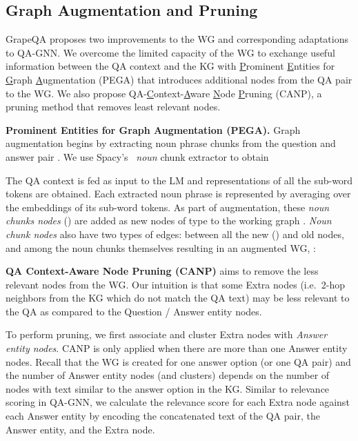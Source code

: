 \documentclass[11pt]{article}
\renewcommand{\paragraph}[1]{\vspace{1mm}\noindent\textbf{#1}}
\newcommand{\methodname}{GrapeQA}
\begin{document}
\subsection{Graph Augmentation and Pruning}
\methodname{} proposes two improvements to the WG and corresponding adaptations to QA-GNN.
We overcome the limited capacity of the WG to exchange useful information between the QA context and the KG with \underline{P}rominent \underline{E}ntities for \underline{G}raph \underline{A}ugmentation (PEGA) that introduces additional nodes from the QA pair to the WG.
We also propose QA-\underline{C}ontext-\underline{A}ware \underline{N}ode \underline{P}runing (CANP), a pruning method that removes least relevant nodes.



\paragraph{Prominent Entities for Graph Augmentation (PEGA).}
\label{22}
Graph augmentation begins by extracting noun phrase chunks  from the question and answer pair .
We use Spacy's~\cite{Honnibal_spaCy_Industrial-strength_Natural_2020} \emph{noun} chunk extractor  to obtain

The QA context is fed as input to the LM and representations of all the sub-word tokens are obtained.
Each extracted noun phrase is represented by averaging over the embeddings of its sub-word tokens.
As part of augmentation, these \emph{noun chunks nodes} () are added as new nodes of type  to the working graph .
\emph{Noun chunk nodes} also have two types of edges:  between all the new () and old  nodes, and  among the noun chunks themselves resulting in an augmented WG, :





\paragraph{QA Context-Aware Node Pruning (CANP)}
\label{23}
aims to remove the less relevant nodes from the WG.
Our intuition is that some Extra nodes (i.e.~2-hop neighbors from the KG which do not match the QA text) may be less relevant to the QA as compared to the Question / Answer entity nodes.

To perform pruning, we first associate and cluster Extra nodes with \emph{Answer entity nodes}.
CANP is only applied when there are more than one Answer entity nodes.
Recall that the WG is created for one answer option (or one QA pair) and the number of Answer entity nodes (and clusters) depends on the number of nodes with text similar to the answer option in the KG.
Similar to relevance scoring in QA-GNN, we calculate the relevance score for each Extra node  against each Answer entity  by encoding the concatenated text of the QA pair, the Answer entity, and the Extra node.
\end{document}
